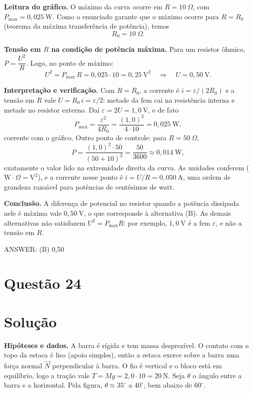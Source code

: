 \documentclass{article}%
\begin{document}
\textbf{Leitura do gráfico.} O máximo da curva ocorre em $R=10\ \Omega$, com $P_{\max}=0{,}025\ \text{W}$. Como o enunciado garante que o máximo ocorre para $R=R_0$ (teorema da máxima transferência de potência), temos
\[
R_0=10\ \Omega .
\]

\textbf{Tensão em $R$ na condição de potência máxima.} Para um resistor ôhmico, $P=\dfrac{U^2}{R}$. Logo, no ponto de máximo:
\[
U^2=P_{\max}\,R=0{,}025\cdot 10=0{,}25\ \text{V}^2
\quad\Longrightarrow\quad
U=0{,}50\ \text{V}.
\]

\textbf{Interpretação e verificação.} Com $R=R_0$, a corrente é $i=\varepsilon/(2R_0)$ e a tensão em $R$ vale $U=R_0\,i=\varepsilon/2$: metade da fem cai na resistência interna e metade no resistor externo. Daí $\varepsilon=2U=1{,}0\ \text{V}$, e de fato
\[
P_{\max}=\frac{\varepsilon^2}{4R_0}=\frac{(1{,}0)^2}{4\cdot 10}=0{,}025\ \text{W},
\]
coerente com o gráfico. Outro ponto de controle: para $R=50\ \Omega$,
\[
P=\frac{(1{,}0)^2\cdot 50}{(50+10)^2}=\frac{50}{3600}\approx 0{,}014\ \text{W},
\]
exatamente o valor lido na extremidade direita da curva. As unidades conferem ($\text{W}\cdot\Omega=\text{V}^2$), e a corrente nesse ponto é $i=U/R=0{,}050\ \text{A}$, uma ordem de grandeza razoável para potências de centésimos de watt.

\textbf{Conclusão.} A diferença de potencial no resistor quando a potência dissipada nele é máxima vale $0{,}50\ \text{V}$, o que corresponde à alternativa (B). As demais alternativas não satisfazem $U^2=P_{\max}R$: por exemplo, $1{,}0\ \text{V}$ é a fem $\varepsilon$, e não a tensão em $R$.

ANSWER: (B) 0,50%
\newpage%
\section*{Questão 24}

\section*{Solução}

\textbf{Hipóteses e dados.} A barra é rígida e tem massa desprezível. O contato com o topo da estaca é liso (apoio simples), então a estaca exerce sobre a barra uma força normal $\vec N$ perpendicular à barra. O fio é vertical e o bloco está em equilíbrio, logo a tração vale $T = Mg = 2{,}0\cdot 10 = 20\ \text{N}$. Seja $\theta$ o ângulo entre a barra e a horizontal. Pela figura, $\theta \approx 35^\circ$ a $40^\circ$, bem abaixo de $60^\circ$.
\end{document}
